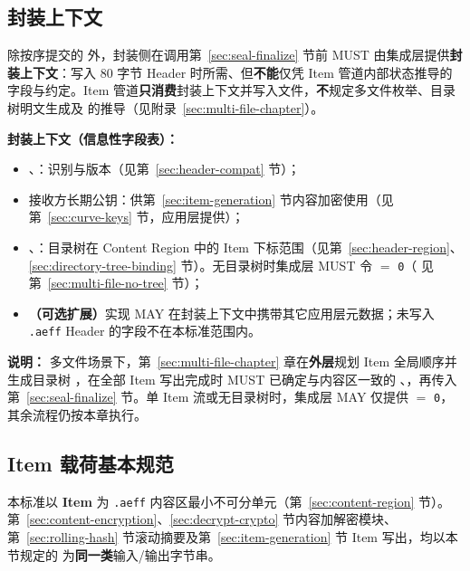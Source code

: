 \subsection{封装上下文}\label{sec:seal-context}

除按序提交的  外，封装侧在调用第~\ref{sec:seal-finalize} 节前 MUST 由集成层提供\textbf{封装上下文}：写入 80 字节 Header 时所需、但\textbf{不能}仅凭 Item 管道内部状态推导的字段与约定。Item 管道\textbf{只消费}封装上下文并写入文件，\textbf{不}规定多文件枚举、目录树明文生成及  的推导（见附录~\ref{sec:multi-file-chapter}）。

\textbf{封装上下文（信息性字段表）：}
\begin{itemize}
  \item {}、：识别与版本（见第~\ref{sec:header-compat} 节）；
  \item 接收方长期公钥：供第~\ref{sec:item-generation} 节内容加密使用（见第~\ref{sec:curve-keys} 节，应用层提供）；
  \item {}、：目录树在 Content Region 中的 Item 下标范围（见第~\ref{sec:header-region}、\ref{sec:directory-tree-binding} 节）。无目录树时集成层 MUST 令  $=$ \texttt{0}（ 见第~\ref{sec:multi-file-no-tree} 节）；
  \item \textbf{（可选扩展）}实现 MAY 在封装上下文中携带其它应用层元数据；未写入 \texttt{.aeff} Header 的字段不在本标准范围内。
\end{itemize}

\textbf{说明：}
多文件场景下，第~\ref{sec:multi-file-chapter} 章在\textbf{外层}规划 Item 全局顺序并生成目录树 ，在全部 Item 写出完成时 MUST 已确定与内容区一致的 、，再传入第~\ref{sec:seal-finalize} 节。单 Item 流或无目录树时，集成层 MAY 仅提供  $=$ \texttt{0}，其余流程仍按本章执行。

\subsection{Item 载荷基本规范}\label{sec:item-payload-norms}
\label{sec:input-normalization}
本标准以 \textbf{Item} 为 \texttt{.aeff} 内容区最小不可分单元（第~\ref{sec:content-region} 节）。第~\ref{sec:content-encryption}、\ref{sec:decrypt-crypto} 节内容加解密模块、第~\ref{sec:rolling-hash} 节滚动摘要及第~\ref{sec:item-generation} 节 Item 写出，均以本节规定的  为\textbf{同一类}输入/输出字节串。


